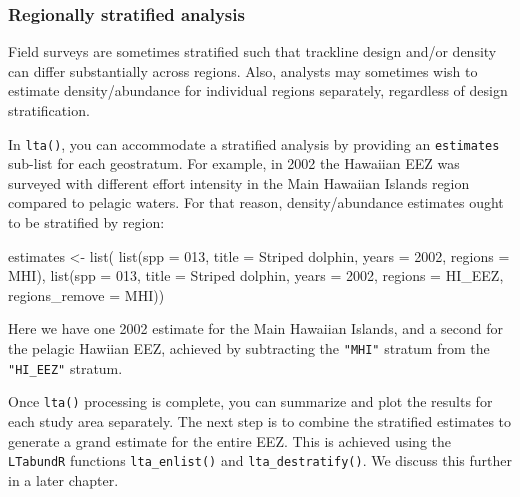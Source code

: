 \documentclass[
]{book}
\newenvironment{Shaded}{\begin{snugshade}}{\end{snugshade}}
\newcommand{\AttributeTok}[1]{\textcolor[rgb]{0.77,0.63,0.00}{#1}}
\newcommand{\DecValTok}[1]{\textcolor[rgb]{0.00,0.00,0.81}{#1}}
\newcommand{\FunctionTok}[1]{\textcolor[rgb]{0.00,0.00,0.00}{#1}}
\newcommand{\NormalTok}[1]{#1}
\newcommand{\OtherTok}[1]{\textcolor[rgb]{0.56,0.35,0.01}{#1}}
\newcommand{\StringTok}[1]{\textcolor[rgb]{0.31,0.60,0.02}{#1}}
\begin{document}
\hypertarget{regionally-stratified-analysis}{%
\subsubsection*{Regionally stratified analysis}\label{regionally-stratified-analysis}}

Field surveys are sometimes stratified such that trackline design and/or density can differ substantially across regions. Also, analysts may sometimes wish to estimate density/abundance for individual regions separately, regardless of design stratification.

In \texttt{lta()}, you can accommodate a stratified analysis by providing an \texttt{estimates} sub-list for each geostratum. For example, in 2002 the Hawaiian EEZ was surveyed with different effort intensity in the Main Hawaiian Islands region compared to pelagic waters. For that reason, density/abundance estimates ought to be stratified by region:

\begin{Shaded}
\begin{Highlighting}[]
\NormalTok{estimates }\OtherTok{\textless{}{-}} \FunctionTok{list}\NormalTok{(}
    \FunctionTok{list}\NormalTok{(}\AttributeTok{spp =} \StringTok{\textquotesingle{}013\textquotesingle{}}\NormalTok{,}
         \AttributeTok{title =} \StringTok{\textquotesingle{}Striped dolphin\textquotesingle{}}\NormalTok{,}
         \AttributeTok{years =} \DecValTok{2002}\NormalTok{,}
         \AttributeTok{regions =} \StringTok{\textquotesingle{}MHI\textquotesingle{}}\NormalTok{),}
    \FunctionTok{list}\NormalTok{(}\AttributeTok{spp =} \StringTok{\textquotesingle{}013\textquotesingle{}}\NormalTok{,}
         \AttributeTok{title =} \StringTok{\textquotesingle{}Striped dolphin\textquotesingle{}}\NormalTok{,}
         \AttributeTok{years =} \DecValTok{2002}\NormalTok{,}
         \AttributeTok{regions =} \StringTok{\textquotesingle{}HI\_EEZ\textquotesingle{}}\NormalTok{,}
         \AttributeTok{regions\_remove =} \StringTok{\textquotesingle{}MHI\textquotesingle{}}\NormalTok{))}
\end{Highlighting}
\end{Shaded}

Here we have one 2002 estimate for the Main Hawaiian Islands, and a second for the pelagic Hawiian EEZ, achieved by subtracting the \texttt{"MHI"} stratum from the \texttt{"HI\_EEZ"} stratum.

Once \texttt{lta()} processing is complete, you can summarize and plot the results for each study area separately. The next step is to combine the stratified estimates to generate a grand estimate for the entire EEZ. This is achieved using the \texttt{LTabundR} functions \texttt{lta\_enlist()} and \texttt{lta\_destratify()}. We discuss this further in a later chapter.
\end{document}
